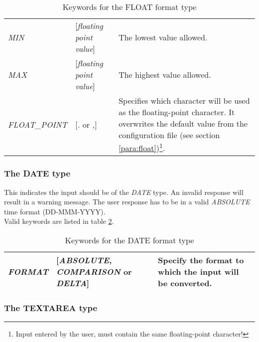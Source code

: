 \documentclass[a4paper]{book}
\begin{document}
\begin{table}[h!tb]
\begin{minipage}[h!tb]{\textwidth}
\begin{tabular}{llp{6cm}} \hline
\textsl{MIN} & [\textit{floating point value}] & The lowest value allowed. \\
\textsl{MAX} & [\textit{floating point value}] & The highest value allowed. \\
\textsl{FLOAT\_POINT} & [\textsl{.} or \textsl{,}]&  Specifies which character will be used as the floating-point 
character. It overwrites the default value from the configuration 
file (see section \ref{para:float})\footnote{ Input entered by the user, must contain the same floating-point 
character!}.\\ \hline
\end{tabular}
\caption{Keywords for the FLOAT format type}\label{tab:float}
\end{minipage}
\end{table}

\subsubsection{The DATE type}

This indicates the input should be of the \textsl{DATE} type. An invalid response 
will result in a warning message. The user response has to be in a valid 
\textsl{ABSOLUTE} time format (DD-MMM-YYYY). \\
Valid keywords are listed in table \ref{tab:date}.

\begin{table}[h!tb]
\begin{minipage}[h!tb]{\textwidth}
\begin{tabular}{llp{4cm}} \hline
\textsl{FORMAT} & [\textsl{ABSOLUTE}, \textsl{COMPARISON} or \textsl{DELTA}] & Specify the format to which the input will be converted.\\ \hline
\end{tabular}
\caption{Keywords for the DATE format type}\label{tab:date}
\end{minipage}
\end{table}

\subsubsection{The TEXTAREA type}
\label{para:mylabel5}
\end{document}
